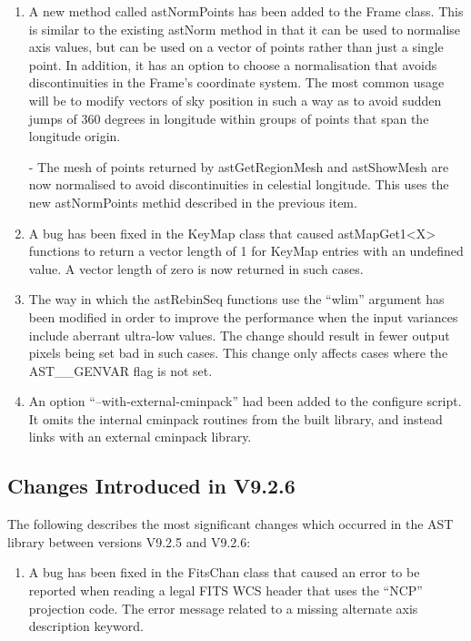 \documentclass[twoside,11pt]{starlink}
\begin{document}
\begin{enumerate}

\item A new method called astNormPoints has been added to the Frame
class. This is similar to the existing astNorm method in that it can be
used to normalise axis values, but can be used on a vector of points rather
than just a single point. In addition, it has an option to choose a
normalisation that avoids discontinuities in the Frame's coordinate
system. The most common usage will be to modify vectors of sky position
in such a way as to avoid sudden jumps of 360 degrees in longitude within
groups of points that span the longitude origin.

- The mesh of points returned by astGetRegionMesh and astShowMesh are now
normalised to avoid discontinuities in celestial longitude. This uses the
new astNormPoints methid described in the previous item.

\item A bug has been fixed in the KeyMap class that caused astMapGet1<X>
functions to return a vector length of 1 for KeyMap entries with an
undefined value. A vector length of zero is now returned in such cases.

\item The way in which the astRebinSeq functions use the ``wlim'' argument
has been modified in order to improve the performance when the input
variances include aberrant ultra-low values. The change should result in
fewer output pixels being set bad in such cases. This change only affects
cases where the AST\_\_GENVAR flag is not set.

\item An option ``--with-external-cminpack'' had been added to the configure
script. It omits the internal cminpack routines from the built library, and
instead links with an external cminpack library.

\end{enumerate}


\subsection{Changes Introduced in V9.2.6}
The following describes the most significant changes which
occurred in the AST library between versions V9.2.5 and V9.2.6:

\begin{enumerate}

\item A bug has been fixed in the FitsChan class that caused an error to be
reported when reading a legal FITS WCS header that uses the ``NCP''
projection code. The error message related to a missing alternate axis
description keyword.

\end{enumerate}
\end{document}
